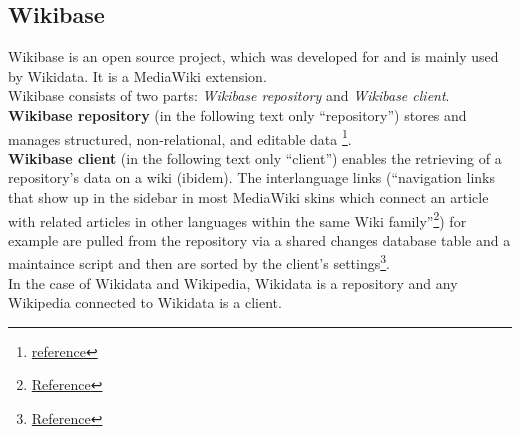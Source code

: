 \subsection{Wikibase}
Wikibase is an open source project, which was developed for and is mainly used by Wikidata. It is a MediaWiki extension. \\
Wikibase consists of two parts: \textit{Wikibase repository} and \textit{Wikibase client}. \textbf{Wikibase repository} (in the following text only ``repository'')  stores and manages structured, non-relational, and editable data \footnote{\href{http://wikiba.se/}{reference}}. \\
\textbf{Wikibase client} (in the following text only ``client'') enables the retrieving of a repository's data on a wiki (ibidem). The interlanguage links (``navigation links that show up in the sidebar in most MediaWiki skins which connect an article with related articles in other languages within the same Wiki family''\footnote{\href{https://www.mediawiki.org/wiki/Interlanguage_links}{Reference}}) for example are pulled from the repository via a shared changes database table and a maintaince script and then are sorted by the client's settings\footnote{\href{https://www.mediawiki.org/wiki/Extension:Wikibase_Client}{Reference}}. \\
In the case of Wikidata and Wikipedia, Wikidata is a repository and any Wikipedia connected to Wikidata is a client.